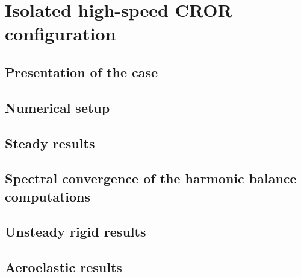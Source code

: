 \chapter{Isolated high-speed CROR configuration}
\label{cha:dream_hs_isolated}

\chabstract{}


\newpage

\section{Presentation of the case}
\label{sec:dream_hs_presentation}


\section{Numerical setup}
\label{sec:dream_hs_numerical}


\section{Steady results}
\label{sec:dream_hs_steady_results}


\section{Spectral convergence of the harmonic balance computations}
\label{sec:dream_hs_spectral_convergence}


\section{Unsteady rigid results}
\label{sec:dream_hs_rigid_results}


\section{Aeroelastic results}
\label{sec:dream_hs_ael_results}

